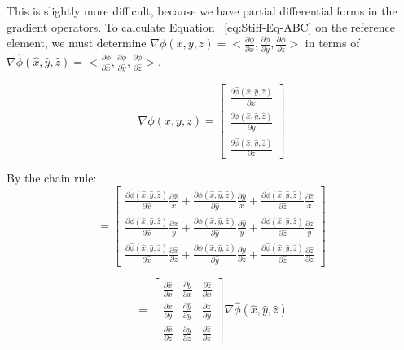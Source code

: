 This is slightly more difficult, because we have partial differential forms in the gradient operators. To calculate Equation ~\ref{eq:Stiff-Eq-ABC} on the reference element, we must determine $\nabla \phi(x,y,z) = <\frac{\partial \phi}{\partial x}, \frac{\partial \phi}{\partial y}, \frac{\partial \phi}{\partial z}>$ in terms of $\nabla \hat{\phi}(\hat{x}, \hat{y}, \hat{z}) = <\frac{\partial \phi}{\partial \hat{x}}, \frac{\partial \phi}{\partial \hat{y}}, \frac{\partial \phi}{\partial \hat{z}}>$.

\begin{equation}
\nabla \phi(x,y,z) = \begin{bmatrix}
\frac{\partial \hat{\phi}(\hat{x}, \hat{y}, \hat{z})}{\partial x} \\
\frac{\partial \hat{\phi}(\hat{x}, \hat{y}, \hat{z})}{\partial y} \\
\frac{\partial \hat{\phi}(\hat{x}, \hat{y}, \hat{z})}{\partial z}
\end{bmatrix}
\end{equation}

By the chain rule:
\begin{equation}
= \begin{bmatrix}
\frac{\partial \hat{\phi}(\hat{x}, \hat{y}, \hat{z})}{\partial \hat{x}} \frac{\partial \hat{x}}{x} + \frac{\partial \hat{\phi}(\hat{x}, \hat{y}, \hat{z})}{\partial \hat{y}} \frac{\partial \hat{y}}{x} + \frac{\partial \hat{\phi}(\hat{x}, \hat{y}, \hat{z})}{\partial \hat{z}} \frac{\partial \hat{z}}{x} \\
\frac{\partial \hat{\phi}(\hat{x}, \hat{y}, \hat{z})}{\partial \hat{x}} \frac{\partial \hat{x}}{y} + \frac{\partial \hat{\phi}(\hat{x}, \hat{y}, \hat{z})}{\partial \hat{y}} \frac{\partial \hat{y}}{y} + \frac{\partial \hat{\phi}(\hat{x}, \hat{y}, \hat{z})}{\partial \hat{z}} \frac{\partial \hat{z}}{y} \\
\frac{\partial \hat{\phi}(\hat{x}, \hat{y}, \hat{z})}{\partial \hat{x}} \frac{\partial \hat{x}}{\partial z} + \frac{\partial \hat{\phi}(\hat{x}, \hat{y}, \hat{z})}{\partial \hat{y}} \frac{\partial \hat{y}}{\partial z} + \frac{\partial \hat{\phi}(\hat{x}, \hat{y}, \hat{z})}{\partial \hat{z}} \frac{\partial \hat{z}}{\partial z}
\end{bmatrix} 
\end{equation}

\begin{equation}
= \begin{bmatrix}
\frac{\partial \hat{x}}{\partial x} & \frac{\partial \hat{y}}{\partial x} & \frac{\partial \hat{z}}{\partial x} \\
\frac{\partial \hat{x}}{\partial y} & \frac{\partial \hat{y}}{\partial y} & \frac{\partial \hat{z}}{\partial y} \\
\frac{\partial \hat{x}}{\partial z} & \frac{\partial \hat{y}}{\partial z} & \frac{\partial \hat{z}}{\partial z}
\end{bmatrix} \nabla \hat{\phi}(\hat{x}, \hat{y}, \hat{z})
\end{equation}


